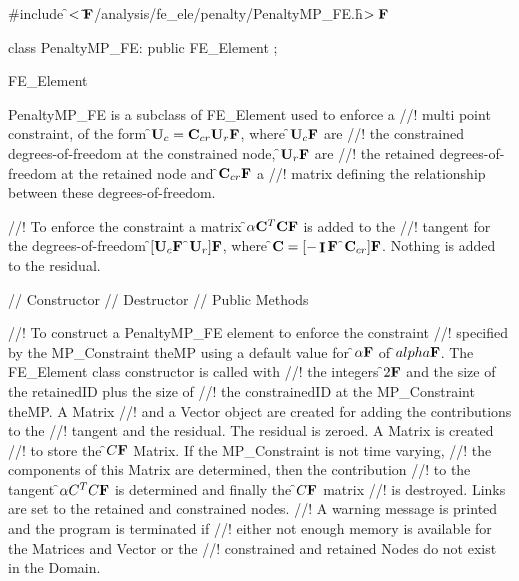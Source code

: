 
\indent \#include \f$<\tilde{ }{\bf F}$/analysis/fe\_ele/penalty/PenaltyMP\_FE.h\f$>{\bf F}$

\indent class PenaltyMP\_FE: public FE\_Element ;

\indent FE\_Element
\indent{} 

\indent PenaltyMP\_FE is a subclass of FE\_Element used to enforce a
//! multi point constraint, of the form \f${\bf U}_c = {\bf C}_{cr} {\bf U}_r{\bf F}$, where \f${\bf U}_c{\bf F}$ are
//! the constrained degrees-of-freedom at the constrained node, \f${\bf U}_r{\bf F}$ are
//! the retained degrees-of-freedom at the retained node and \f${\bf C}_{cr}{\bf F}$ a
//! matrix defining the relationship between these degrees-of-freedom. 

//! To enforce the constraint a matrix \f$\alpha {\bf C}^T {\bf C}{\bf F}$ is added to the
//! tangent for the degrees-of-freedom \f$[{\bf U}_c{\bf F}$ \f${\bf U}_r]{\bf F}$, where \f${\bf C} = [-\mathop{\cal {\bf I}}{\bf F}$ 
\f${\bf C}_{cr}]{\bf F}$. Nothing is added to the residual.  

\indent\indent // Constructor
\indent{}
\indent\indent // Destructor
\indent{}
\indent\indent // Public Methods
\indent{} 
\indent{}  
\indent{} 
\indent{}

//! To construct a PenaltyMP\_FE element to enforce the constraint
//! specified by the MP\_Constraint \p theMP using a default value for
\f$\alpha{\bf F}$ of \f$alpha{\bf F}$. The FE\_Element class constructor is called with
//! the integers \f$2{\bf F}$ and the size of the \p retainedID plus the size of
//! the \p constrainedID at the MP\_Constraint \p theMP. A Matrix
//! and a Vector object are created for adding the contributions to the
//! tangent and the residual. The residual is zeroed. A Matrix is created
//! to store the \f$C{\bf F}$ Matrix. If the MP\_Constraint is not time varying,
//! the components of this Matrix are determined, then the contribution
//! to the tangent \f$\alpha C^TC{\bf F}$ is determined and finally the \f$C{\bf F}$ matrix
//! is destroyed. Links are set to the retained and constrained nodes.
//! A warning message is printed and the program is terminated if
//! either not enough memory is available for the Matrices and Vector or the
//! constrained and retained Nodes do not exist in the Domain.


